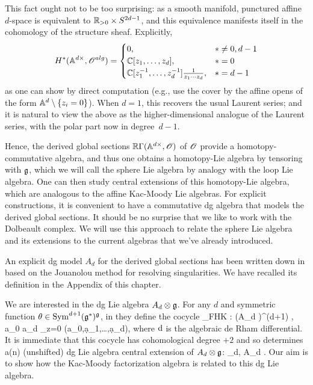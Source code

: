 This fact ought not to be too surprising: 
as a smooth manifold, punctured affine $d$-space is equivalent to $\RR_{> 0} \times S^{2d-1}$,
and this equivalence manifests itself in the cohomology of the structure sheaf.
Explicitly,
\[
H^*(\AA^{d\times}, \sO^{alg}) = 
\begin{cases} 0, & * \neq 0, d-1 \\ \CC[z_1,\ldots,z_d], & * = 0 \\ \CC[z_1^{-1},\ldots,z_d^{-1}] \frac{1}{z_1 \cdots z_d}, & * = d-1 \end{cases}
\]
as one can show by direct computation (e.g., use the cover by the affine opens of the form $\AA^d \setminus \{z_i =0\}$).
When $d = 1$, this recovers the usual Laurent series;
and it is natural to view the above as the higher-dimensional analogue of the Laurent series,
with the polar part now in degree~$d-1$.

Hence, the derived global sections $\RR\Gamma(\AA^{d\times},\sO)$ of $\sO$ provide a homotopy-commutative algebra,
and thus one obtains a homotopy-Lie algebra by tensoring with $\fg$,
which we will call the sphere Lie algebra by analogy with the loop Lie algebra.
One can then study central extensions of this homotopy-Lie algebra, which are analogous to the affine Kac-Moody Lie algebras.
For explicit constructions, it is convenient to have a commutative dg algebra that models the derived global sections.
It should be no surprise that we like to work with the Dolbeault complex.
We will use this approach to relate the sphere Lie algebra and its extensions to the current algebras that we've already introduced.

An explicit dg model $A_d$ for the derived global sections has been written down in \cite{FHK} based on the Jouanolou method for resolving singularities. 
We have recalled its definition in the Appendix of this chapter.

We are interested in the dg Lie algebra $A_d \tensor \fg$. 
For any $d$ and symmetric function $\theta \in \Sym^{d+1}(\fg^*)^\fg$, in \cite{FHK} they define the cocycle
\be\label{fhk cocycle}
\theta_{FHK} : (A_d \tensor \fg)^{\tensor (d+1)} \to \CC \;\; , \;\; a_0 \cdots a_d \mapsto \Res_{z=0} \theta(a_0,\d a_1,\ldots,\d a_d),
\ee
where $\d$ is the algebraic de Rham differential.
It is immediate that this cocycle has cohomological degree $+2$ and so determines a(n) (unshifted) dg Lie algebra central extension of $A_d \tensor \fg$:
\be\label{gdt}
\CC \to \Hat{\fg}_{d, \theta} \to A_d \tensor \fg .
\ee
Our aim is to show how the Kac-Moody factorization algebra is related to this dg Lie algebra. 

